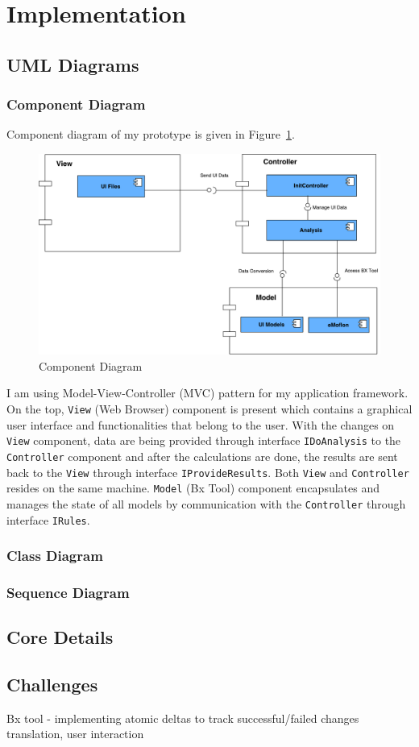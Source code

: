 \section{Implementation}\label{sec:implementation}

\subsection{UML Diagrams}\label{subsec:umldiagrams}
\subsubsection{Component Diagram}\label{subsubsec:component}
Component diagram of my prototype is given in Figure~\ref{fig:Component_Diagram}.
\begin{figure}
	\includegraphics[width=1\textwidth]{figures/Component_Diagram}
	\caption{Component Diagram}
	\label{fig:Component_Diagram}
\end{figure}

I am using Model-View-Controller (MVC) pattern for my application framework. 
On the top, \texttt{View} (Web Browser) component is present which contains a graphical user interface and functionalities that belong to the user. With the changes on \texttt{View} component, data are being provided through interface \texttt{IDoAnalysis} to the \texttt{Controller} component and after the calculations are done, the results are sent back to the \texttt{View} through interface \texttt{IProvideResults}. Both \texttt{View} and \texttt{Controller} resides on the same machine. \texttt{Model} (Bx Tool) component encapsulates and manages the state of all models by communication with the \texttt{Controller} through interface \texttt{IRules}.
\subsubsection{Class Diagram}\label{subsubsec:classes}
\subsubsection{Sequence Diagram}\label{subsubsec:sequence}

\subsection{Core Details}\label{subsec:coredetails}

\subsection{Challenges}\label{subsec:implchallenges}
Bx tool - implementing atomic deltas to track successful/failed changes translation, user interaction 
 



